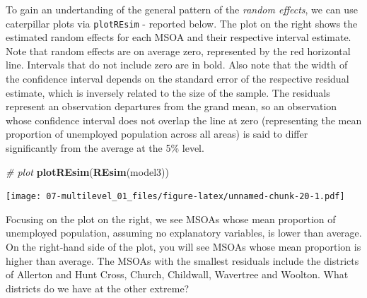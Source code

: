 \documentclass[
]{book}
\newenvironment{Shaded}{\begin{snugshade}}{\end{snugshade}}
\newcommand{\CommentTok}[1]{\textcolor[rgb]{0.56,0.35,0.01}{\textit{#1}}}
\newcommand{\KeywordTok}[1]{\textcolor[rgb]{0.13,0.29,0.53}{\textbf{#1}}}
\newcommand{\NormalTok}[1]{#1}
\newcommand{\OperatorTok}[1]{\textcolor[rgb]{0.81,0.36,0.00}{\textbf{#1}}}
\newcommand{\StringTok}[1]{\textcolor[rgb]{0.31,0.60,0.02}{#1}}
\begin{document}
To gain an undertanding of the general pattern of the \emph{random effects}, we can use caterpillar plots via \texttt{plotREsim} - reported below. The plot on the right shows the estimated random effects for each MSOA and their respective interval estimate. Note that random effects are on average zero, represented by the red horizontal line. Intervals that do not include zero are in bold. Also note that the width of the confidence interval depends on the standard error of the respective residual estimate, which is inversely related to the size of the sample. The residuals represent an observation departures from the grand mean, so an observation whose confidence interval does not overlap the line at zero (representing the mean proportion of unemployed population across all areas) is said to differ significantly from the average at the 5\% level.

\begin{Shaded}
\begin{Highlighting}[]
\CommentTok{# plot}
\KeywordTok{plotREsim}\NormalTok{(}\KeywordTok{REsim}\NormalTok{(model3)) }
\end{Highlighting}
\end{Shaded}

\texttt{[image: 07-multilevel\_01\_files/figure-latex/unnamed-chunk-20-1.pdf]}

Focusing on the plot on the right, we see MSOAs whose mean proportion of unemployed population, assuming no explanatory variables, is lower than average. On the right-hand side of the plot, you will see MSOAs whose mean proportion is higher than average. The MSOAs with the smallest residuals include the districts of Allerton and Hunt Cross, Church, Childwall, Wavertree and Woolton. What districts do we have at the other extreme?

\begin{Shaded}
\end{Shaded}
\end{document}
